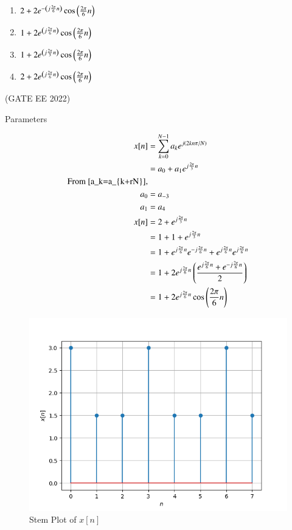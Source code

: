 \documentclass[journal,12pt,twocolumn]{IEEEtran}
\theoremstyle{remark}
\begin{document}
\begin{enumerate}[label=(\Alph*)]
\item $2+2e^{-\left(j\frac{2\pi}{6}n\right)}\cos{\ensuremath{\left(\frac{2\pi}{6}n\right)}}$
\item $1+2e^{\left(j\frac{2\pi}{6}n\right)}\cos{\ensuremath{\left(\frac{2\pi}{6}n\right)}}$
\item $1+2e^{\left(j\frac{2\pi}{3}n\right)}\cos{\ensuremath{\left(\frac{2\pi}{6}n\right)}}$
\item $2+2e^{\left(j\frac{2\pi}{6}n\right)}\cos{\ensuremath{\left(\frac{2\pi}{6}n\right)}}$
\end{enumerate}
\hfill(GATE EE 2022)
\\
\solution
\begin{table}[htbp]
	\centering
	\def\arraystretch{1.5}
	
	\caption{Parameters}
	\label{tab:parameters_ee_49}
\end{table}

\begin{align}
x[n] &= \sum_{k=0}^{N-1}a_ke^{j\brak{2kn\pi/N}}\\
&= a_{0} + a_{1}e^{j\frac{2\pi}{3}n}  \\
\notag \text{From \eqref{a_k=a_{k+rN}},}\\
a_0 &= a_{-3}\\
a_1 &= a_4 \\
x[n]&= 2 + e^{j\frac{2\pi}{3}n}\\
&= 1+1+e^{j\frac{2\pi}{3}n}\\
&= 1+e^{j\frac{2\pi}{6}n}e^{-j\frac{2\pi}{6}n}+e^{j\frac{2\pi}{6}n}e^{j\frac{2\pi}{6}n}\\
&= 1+2e^{j\frac{2\pi}{6}n}\brak{\frac{e^{j\frac{2\pi}{6}n}+e^{-j\frac{2\pi}{6}n}}{2}} \\
&= 1+2e^{j\frac{2\pi}{6}n}\cos{\brak{\frac{2\pi}{6}n}}
\end{align}
\begin{figure}[htbp]
	\includegraphics[width=\columnwidth]{figs/plot.png}
	\caption{Stem Plot of $x[n]$}
	\label{fig:plot_ee49}
\end{figure}
\end{document}
